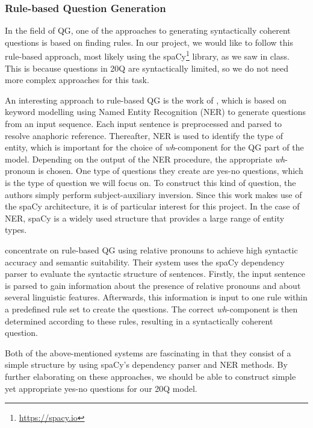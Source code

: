 \documentclass[11pt,a4paper]{article}
\begin{document}
\subsubsection{Rule-based Question Generation}

In the field of QG, one of the approaches to generating syntactically coherent questions is based on finding rules. 
In our project, we would like to follow this rule-based approach, most likely using the spaCy\footnote{\url{https://spacy.io}} library, as we saw in class.
This is because questions in 20Q are syntactically limited, so we do not need more complex approaches for this task.

An interesting approach to rule-based QG is the work of \citet{MhatreEa2019}, which is based on keyword modelling using Named Entity Recognition (NER) to generate questions from an input sequence. 
Each input sentence is preprocessed and parsed to resolve anaphoric reference. 
Thereafter, NER is used to identify the type of entity, which is important for the choice of \textit{wh}-component for the QG part of the model. 
Depending on the output of the NER procedure, the appropriate \textit{wh}-pronoun is chosen. 
One type of questions they create are yes-no questions, which is the type of question we will focus on.
To construct this kind of question, the authors simply perform subject-auxiliary inversion. 
Since this work makes use of the spaCy architecture, it is of particular interest for this project.
In the case of NER, spaCy is a widely used structure that provides a large range of entity types. 

\citet{KhullarEa2018} concentrate on rule-based QG using relative pronouns to achieve high syntactic accuracy and semantic suitability. 
Their system uses the spaCy dependency parser to evaluate the syntactic structure of sentences. 
Firstly, the input sentence is parsed to gain information about the presence of relative pronouns and about several linguistic features. 
Afterwards, this information is input to one rule within a predefined rule set to create the questions. 
The correct \textit{wh}-component is then determined according to these rules, resulting in a syntactically coherent question. 

Both of the above-mentioned systems are fascinating in that they consist of a simple structure by using spaCy's dependency parser and NER methods. 
By further elaborating on these approaches, we should be able to construct simple yet appropriate yes-no questions for our 20Q model.
\end{document}
